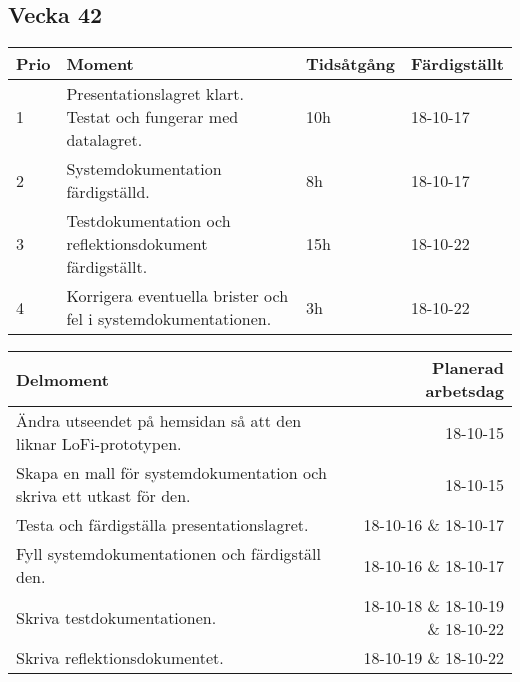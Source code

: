 \documentclass{TDP003mall}
\begin{document}
\subsection{Vecka 42}
\begin{table}[!h]
\begin{tabularx}{\linewidth}{|l|X|l|l|}
\hline
\textbf{Prio} & \textbf{Moment} & \textbf{Tidsåtgång} & \textbf{Färdigställt}\\\hline
1& Presentationslagret klart. Testat och fungerar med datalagret. & 10h & 18-10-17 \\\hline
2& Systemdokumentation färdigställd. & 8h & 18-10-17 \\\hline
3& Testdokumentation och reflektionsdokument färdigställt. & 15h & 18-10-22 \\\hline
4& Korrigera eventuella brister och fel i systemdokumentationen. & 3h & 18-10-22 \\\hline
\end{tabularx}
\end{table}

\begin{table}[!h]
\begin{tabularx}{\linewidth}{|X|r|}\hline
    \textbf{Delmoment} & \textbf{ Planerad arbetsdag} \\\hline
    Ändra utseendet på hemsidan så att den liknar LoFi-prototypen. & 18-10-15 \\\hline
    Skapa  en mall för systemdokumentation och skriva ett utkast för den. & 18-10-15 \\\hline
    Testa och färdigställa presentationslagret. & 18-10-16 \& 18-10-17 \\\hline
    Fyll systemdokumentationen och färdigställ den. & 18-10-16 \& 18-10-17 \\\hline
    Skriva testdokumentationen. & 18-10-18 \& 18-10-19 \& 18-10-22 \\\hline
    Skriva reflektionsdokumentet. & 18-10-19 \& 18-10-22 \\\hline
\end{tabularx}
\end{table}
\end{document}

